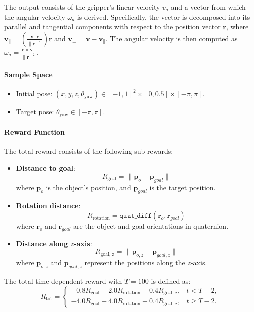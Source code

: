 The output consists of the gripper's linear velocity $v_a$ and a vector from which the angular velocity $\omega_a$ is derived. Specifically, the vector is decomposed into its parallel and tangential components with respect to the position vector $\mathbf{r}$, where $\mathbf{v}_{\parallel} = \left( \frac{\mathbf{v} \cdot \mathbf{r}}{\|\mathbf{r}\|^2} \right) \mathbf{r}$ and $\mathbf{v}_{\perp} = \mathbf{v} - \mathbf{v}_{\parallel}$. The angular velocity is then computed as $\omega_a = \frac{\mathbf{r} \times \mathbf{v}_{\perp}}{\|\mathbf{r}\|^2}$. 

\paragraph{Sample Space}
\begin{itemize}
    \item Initial pose: $(x, y, z, \theta_\text{yaw}) \in [-1, 1]^2 \times [0, 0.5] \times [-\pi, \pi]$.
    \item Target pose: $\theta_\text{yaw} \in [-\pi, \pi]$.
\end{itemize}

\paragraph{Reward Function}
The total reward consists of the following sub-rewards:
\begin{itemize}
    \item \textbf{Distance to goal}:
    \[
    R_\text{goal} = \lVert \mathbf{p}_o - \mathbf{p}_{goal} \rVert
    \]
    where $\mathbf{p}_o$ is the object's position, and $\mathbf{p}_{goal}$ is the target position.
    
    \item \textbf{Rotation distance}: \[
        R_\text{rotation} = \texttt{quat\_diff}(\mathbf{r}_o, \mathbf{r}_{goal})
    \]
    where $\mathbf{r}_o$ and $\mathbf{r}_{goal}$ are the object and goal orientations in quaternion.

    \item \textbf{Distance along $z$-axis}:
    \[
    R_\text{goal, z} = \lVert \mathbf{p}_{o, z} - \mathbf{p}_{goal, z} \rVert
    \]
    where $\mathbf{p}_{o, z}$ and $\mathbf{p}_{goal, z}$ represent the positions along the $z$-axis.
\end{itemize}

The total time-dependent reward with $T=100$ is defined as:
\[
R_\text{tot} = \begin{cases}
    - 0.8 R_\text{goal} - 2.0 R_\text{rotation} - 0.4 R_\text{goal, z}, & t < T-2, \\
    - 4.0 R_\text{goal} - 4.0 R_\text{rotation} - 0.4 R_\text{goal, z}, & t \geq T-2.
\end{cases}
\]

